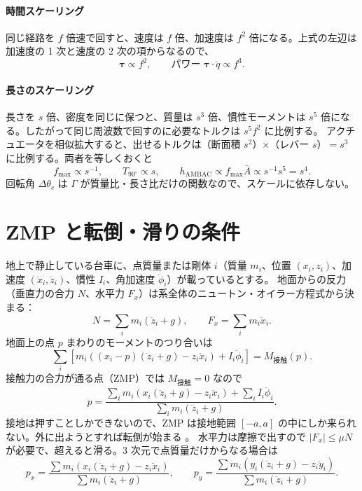 \paragraph{時間スケーリング}
同じ経路を $f$ 倍速で回すと、速度は $f$ 倍、加速度は $f^2$ 倍になる。上式の左辺は加速度の 1 次と速度の 2 次の項からなるので、
\begin{equation}
\bm\tau \propto f^2,\qquad \text{パワー } \bm\tau\cdot\dot q \propto f^3 .
\end{equation}

\paragraph{長さのスケーリング}
長さを $s$ 倍、密度を同じに保つと、質量は $s^3$ 倍、慣性モーメントは $s^5$ 倍になる。したがって同じ周波数で回すのに必要なトルクは $s^5f^2$ に比例する。
アクチュエータを相似拡大すると、出せるトルクは（断面積 $s^2$）×（レバー $s$）$=s^3$ に比例する。両者を等しくおくと
\begin{equation}
f_{\max}\propto s^{-1},\qquad T_{90^\circ}\propto s,\qquad h_{\mathrm{AMBAC}} \propto f_{\max}\bar A \propto s^{-1}s^5 = s^4 .
\end{equation}
回転角 $\Delta\theta_c$ は $\Gamma$ が質量比・長さ比だけの関数なので、スケールに依存しない。

\section{ZMP と転倒・滑りの条件}\label{app:zmp}

地上で静止している台車に、点質量または剛体 $i$（質量 $m_i$、位置 $(x_i,z_i)$、加速度 $(\ddot x_i,\ddot z_i)$、慣性 $I_i$、角加速度 $\ddot\phi_i$）が載っているとする。
地面からの反力（垂直力の合力 $N$、水平力 $F_x$）は系全体のニュートン・オイラー方程式から決まる：
\begin{equation}
N = \sum_i m_i(\ddot z_i+g),\qquad F_x = \sum_i m_i\ddot x_i .
\end{equation}
地面上の点 $p$ まわりのモーメントのつり合いは
\begin{equation}
\sum_i\left[m_i\left((x_i-p)(\ddot z_i+g) - z_i\ddot x_i\right) + I_i\ddot\phi_i\right] = M_{\text{接触}}(p).
\end{equation}
接触力の合力が通る点（ZMP）では $M_{\text{接触}}=0$ なので
\begin{equation}
p = \frac{\sum_i m_i\left(x_i(\ddot z_i+g) - z_i\ddot x_i\right) + \sum_i I_i\ddot\phi_i}{\sum_i m_i(\ddot z_i+g)} . \label{eq:zmp}
\end{equation}
接地は押すことしかできないので、ZMP は接地範囲 $[-a,a]$ の中にしか来られない。外に出ようとすれば転倒が始まる \cite{R28}。
水平力は摩擦で出すので $|F_x|\le\mu N$ が必要で、超えると滑る。3 次元で点質量だけからなる場合は
\begin{equation}
p_x = \frac{\sum m_i\left(x_i(\ddot z_i+g)-z_i\ddot x_i\right)}{\sum m_i(\ddot z_i+g)},\qquad
p_y = \frac{\sum m_i\left(y_i(\ddot z_i+g)-z_i\ddot y_i\right)}{\sum m_i(\ddot z_i+g)} .
\end{equation}

